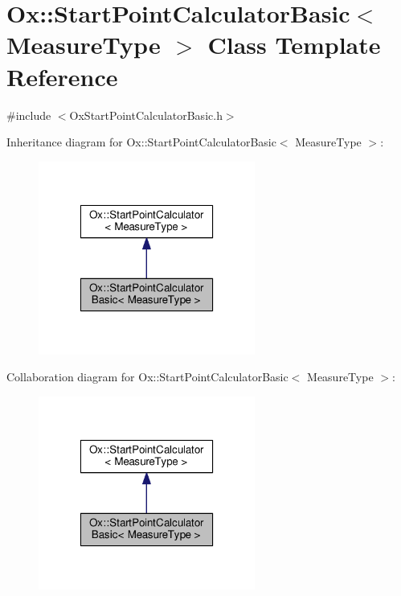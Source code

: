 \hypertarget{class_ox_1_1_start_point_calculator_basic}{\section{Ox\-:\-:Start\-Point\-Calculator\-Basic$<$ Measure\-Type $>$ Class Template Reference}
\label{class_ox_1_1_start_point_calculator_basic}
}


{\ttfamily \#include $<$Ox\-Start\-Point\-Calculator\-Basic.\-h$>$}



Inheritance diagram for Ox\-:\-:Start\-Point\-Calculator\-Basic$<$ Measure\-Type $>$\-:
\nopagebreak
\begin{figure}[H]
\begin{center}
\leavevmode
\includegraphics[width=202pt]{class_ox_1_1_start_point_calculator_basic__inherit__graph}
\end{center}
\end{figure}


Collaboration diagram for Ox\-:\-:Start\-Point\-Calculator\-Basic$<$ Measure\-Type $>$\-:
\nopagebreak
\begin{figure}[H]
\begin{center}
\leavevmode
\includegraphics[width=202pt]{class_ox_1_1_start_point_calculator_basic__coll__graph}
\end{center}
\end{figure}
